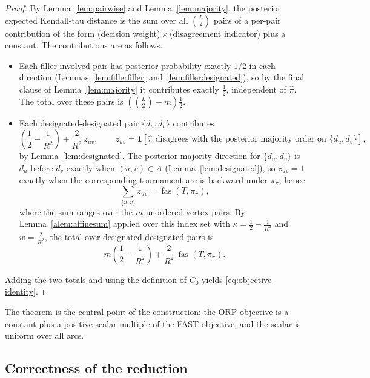 \documentclass[11pt]{article}
\newcommand{\ind}{\mathbf{1}}
\newcommand{\fas}{\operatorname{fas}}
\begin{document}
\begin{proof}
By Lemma~\ref{lem:pairwise} and Lemma~\ref{lem:majority}, the posterior expected Kendall-tau distance is the sum over all $\binom L2$ pairs of a per-pair contribution of the form (decision weight)${}\times{}$(disagreement indicator) plus a constant.  The contributions are as follows.
\begin{itemize}
\item Each filler-involved pair has posterior probability exactly $1/2$ in each direction (Lemmas~\ref{lem:fillerfiller} and~\ref{lem:fillerdesignated}), so by the final clause of Lemma~\ref{lem:majority} it contributes exactly $\tfrac12$, independent of $\hat\pi$.  The total over these pairs is $\left(\binom L2-m\right)\tfrac12$.
\item Each designated-designated pair $\{d_u,d_v\}$ contributes
\begin{equation}
  \left(\frac12-\frac1{R^2}\right)+\frac2{R^2}\,z_{uv},
  \qquad
  z_{uv}=\ind[\hat\pi\text{ disagrees with the posterior majority order on }\{d_u,d_v\}],
\end{equation}
by Lemma~\ref{lem:designated}.  The posterior majority direction for $\{d_u,d_v\}$ is $d_u$ before $d_v$ exactly when $(u,v)\in A$ (Lemma~\ref{lem:designated}), so $z_{uv}=1$ exactly when the corresponding tournament arc is backward under $\pi_{\hat\pi}$; hence
\begin{equation}
  \sum_{\{u,v\}} z_{uv}=\fas(T,\pi_{\hat\pi}),
\end{equation}
where the sum ranges over the $m$ unordered vertex pairs.  By Lemma~\ref{alem:affinesum} applied over this index set with $\kappa=\tfrac12-\tfrac1{R^2}$ and $w=\tfrac2{R^2}$, the total over designated-designated pairs is
\begin{equation}
  m\left(\frac12-\frac1{R^2}\right)+\frac2{R^2}\,\fas(T,\pi_{\hat\pi}).
\end{equation}
\end{itemize}
Adding the two totals and using the definition of $C_0$ yields \eqref{eq:objective-identity}.
\end{proof}

The theorem is the central point of the construction: the ORP objective is a constant plus a positive scalar multiple of the FAST objective, and the scalar is uniform over all arcs.

\subsection{Correctness of the reduction}
\end{document}
